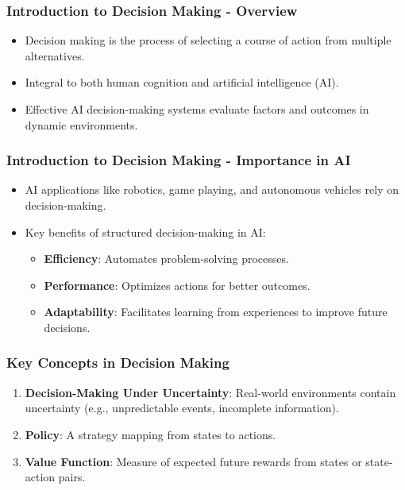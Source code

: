 \documentclass[aspectratio=169]{beamer}
\begin{document}
\frame{\titlepage}

\begin{frame}[fragile]
    \frametitle{Introduction to Decision Making - Overview}
    \begin{itemize}
        \item Decision making is the process of selecting a course of action from multiple alternatives.
        \item Integral to both human cognition and artificial intelligence (AI).
        \item Effective AI decision-making systems evaluate factors and outcomes in dynamic environments.
    \end{itemize}
\end{frame}

\begin{frame}[fragile]
    \frametitle{Introduction to Decision Making - Importance in AI}
    \begin{itemize}
        \item AI applications like robotics, game playing, and autonomous vehicles rely on decision-making.
        \item Key benefits of structured decision-making in AI:
        \begin{itemize}
            \item \textbf{Efficiency}: Automates problem-solving processes.
            \item \textbf{Performance}: Optimizes actions for better outcomes.
            \item \textbf{Adaptability}: Facilitates learning from experiences to improve future decisions.
        \end{itemize}
    \end{itemize}
\end{frame}

\begin{frame}[fragile]
    \frametitle{Key Concepts in Decision Making}
    \begin{enumerate}
        \item \textbf{Decision-Making Under Uncertainty}: Real-world environments contain uncertainty (e.g., unpredictable events, incomplete information).
        \item \textbf{Policy}: A strategy mapping from states to actions.
        \item \textbf{Value Function}: Measure of expected future rewards from states or state-action pairs.
    \end{enumerate}
\end{frame}
\end{document}
